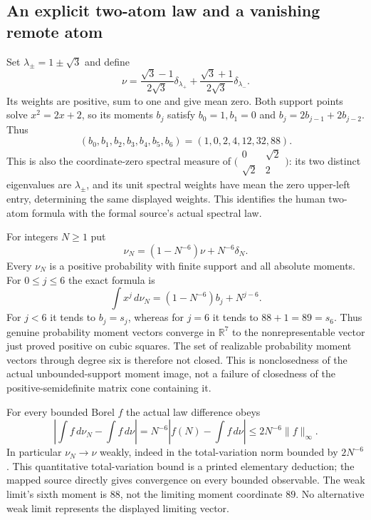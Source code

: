\documentclass[11pt]{article}
\newcommand{\R}{\mathbb R}
\begin{document}
\subsection{An explicit two-atom law and a vanishing remote atom}
Set $\lambda_\pm=1\pm\sqrt3$ and define
\[
 \nu=\frac{\sqrt3-1}{2\sqrt3}\delta_{\lambda_+}
     +\frac{\sqrt3+1}{2\sqrt3}\delta_{\lambda_-}.
\]
Its weights are positive, sum to one and give mean zero.
Both support points solve $x^2=2x+2$, so its moments $b_j$
satisfy $b_0=1,b_1=0$ and $b_j=2b_{j-1}+2b_{j-2}$.
Thus
\[
 (b_0,b_1,b_2,b_3,b_4,b_5,b_6)=(1,0,2,4,12,32,88).
\]
This is also the coordinate-zero spectral measure of
$\bigl(\begin{smallmatrix}0&\sqrt2\\\sqrt2&2\end{smallmatrix}\bigr)$:
its two distinct eigenvalues are $\lambda_\pm$, and its unit
spectral weights have mean the zero upper-left entry, determining
the same displayed weights. This identifies the human two-atom
formula with the formal source's actual spectral law.

For integers $N\geq1$ put
\[
 \nu_N=(1-N^{-6})\nu+N^{-6}\delta_N.
\]
Every $\nu_N$ is a positive probability with finite support and
all absolute moments. For $0\leq j\leq6$ the exact formula is
\begin{equation}\label{eq:escapedmoments}
 \int x^j\,d\nu_N=(1-N^{-6})b_j+N^{j-6}.
\end{equation}
For $j<6$ it tends to $b_j=s_j$, whereas for $j=6$ it tends
to $88+1=89=s_6$. Thus genuine probability moment vectors
converge in $\R^7$ to the nonrepresentable vector just proved
positive on cubic squares. The set of realizable probability
moment vectors through degree six is therefore not closed.
This is nonclosedness of the actual unbounded-support moment
image, not a failure of closedness of the positive-semidefinite
matrix cone containing it.

For every bounded Borel $f$ the actual law difference obeys
\[
 \left|\int f\,d\nu_N-\int f\,d\nu\right|
 =N^{-6}\left|f(N)-\int f\,d\nu\right|
 \leq2N^{-6}\|f\|_\infty.
\]
In particular $\nu_N\to\nu$ weakly, indeed in the total-variation
norm bounded by $2N^{-6}$. This quantitative total-variation
bound is a printed elementary deduction; the mapped source
directly gives convergence on every bounded observable.
The weak limit's sixth moment is $88$, not the limiting moment
coordinate $89$. No alternative weak limit represents the
displayed limiting vector.
\end{document}
